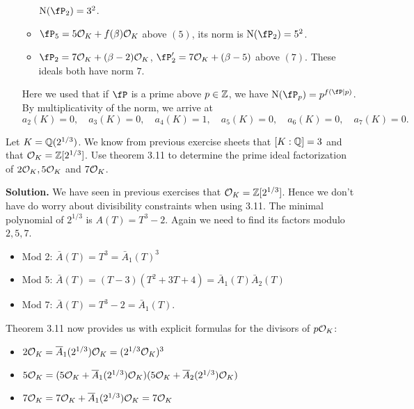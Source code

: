 \documentclass[a4paper,11pt]{article}
\begin{document}
\begin{enumerate}[labelindent=0pt, wide]
\begin{itemize}
                $\Norm(\fP_2) = 3^2$.
            \item $\fP_5 = 5 \cO_K + f(\beta) \cO_K$ above $(5)$, its norm is 
                $\Norm(\fP_2) = 5^2$.
            \item $\fP_2 = 7 \cO_K + (\beta-2) \cO_K$, $\fP_2' = 
                7 \cO_K + (\beta-5)$ above $(7)$. These ideals both have norm
                $7$.
        \end{itemize}
        Here we used that if $\fP$ is a prime above $p \in \mathbb{Z}$, 
        we have $\Norm(\fP_p) = p^{f(\fP|p)}$.
        By multiplicativity of the norm, we arrive at
        \begin{equation*}
            a_2(K) = 0, \quad
            a_3(K) = 0, \quad
            a_4(K) = 1, \quad
            a_5(K) = 0, \quad
            a_6(K) = 0, \quad
            a_7(K) = 0.
        \end{equation*}
\end{enumerate}

Let $K=\mathbb{Q}(2^{1/3})$. We know from previous exercise sheets that $[K:\mathbb{Q}] = 3$
and that $\mathcal{O}_K = \mathbb{Z}[2^{1/3}]$. Use theorem 3.11 to determine the prime ideal
factorization of $2 \mathcal{O}_K, 5\mathcal{O}_K$ and $7\mathcal{O}_K$.

\textbf{Solution.} We have seen in previous exercises that 
$\mathcal{O}_K = \mathbb{Z}[2^{1/3}]$. Hence we don't have do worry about divisibility
constraints when using 3.11. The minimal polynomial of $2^{1/3}$ is 
$A(T) = T^3 - 2$. Again we need to find its factors modulo $2,5, 7$. 
\begin{itemize}
    \item Mod 2: $\bar A(T) = T^3 = \bar A_1(T)^3$
    \item Mod 5: $\bar A(T) = (T-3)(T^2+3T+4) = \bar A_1(T) \bar A_2(T)$
    \item Mod 7: $\bar A(T) = T^3 - 2 = \bar A_1(T)$. 
\end{itemize}
Theorem 3.11 now provides us with explicit formulas for the divisors of 
$p \mathcal{O}_K$:
\begin{itemize}
    \item $2\mathcal{O}_K = \overline A_1(2^{1/3})\mathcal{O}_K = (2^{1/3}\mathcal{O}_K)^3$
    \item $5\mathcal{O}_K = (5\mathcal{O}_K + \overline A_1(2^{1/3})\mathcal{O}_K)(5 \mathcal{O}_K + \overline
        A_2(2^{1/3})\mathcal{O}_K)$
    \item $7\mathcal{O}_K = 7 \mathcal{O}_K + \overline A_1(2^{1/3})\mathcal{O}_K = 7\mathcal{O}_K$
\end{itemize}
\end{document}
